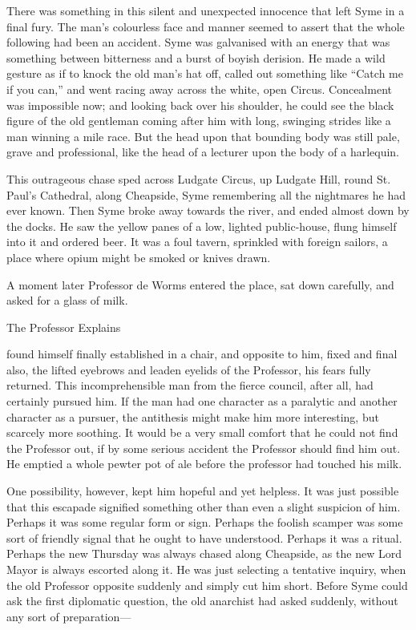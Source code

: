 There was something in this silent and unexpected innocence that left Syme in a final fury. The man’s colourless face and manner seemed to assert that the whole following had been an accident. Syme was galvanised with an energy that was something between bitterness and a burst of boyish derision. He made a wild gesture as if to knock the old man’s hat off, called out something like “Catch me if you can,” and went racing away across the white, open Circus. Concealment was impossible now; and looking back over his shoulder, he could see the black figure of the old gentleman coming after him with long, swinging strides like a man winning a mile race. But the head upon that bounding body was still pale, grave and professional, like the head of a lecturer upon the body of a harlequin.

This outrageous chase sped across Ludgate Circus, up Ludgate Hill, round St. Paul’s Cathedral, along Cheapside, Syme remembering all the nightmares he had ever known. Then Syme broke away towards the river, and ended almost down by the docks. He saw the yellow panes of a low, lighted public-house, flung himself into it and ordered beer. It was a foul tavern, sprinkled with foreign sailors, a place where opium might be smoked or knives drawn.

A moment later Professor de Worms entered the place, sat down carefully, and asked for a glass of milk.

\chap[professorexplains] The Professor Explains

 found himself finally established in a chair, and opposite to him, fixed and final also, the lifted eyebrows and leaden eyelids of the Professor, his fears fully returned. This incomprehensible man from the fierce council, after all, had certainly pursued him. If the man had one character as a paralytic and another character as a pursuer, the antithesis might make him more interesting, but scarcely more soothing. It would be a very small comfort that he could not find the Professor out, if by some serious accident the Professor should find him out. He emptied a whole pewter pot of ale before the professor had touched his milk.

One possibility, however, kept him hopeful and yet helpless. It was just possible that this escapade signified something other than even a slight suspicion of him. Perhaps it was some regular form or sign. Perhaps the foolish scamper was some sort of friendly signal that he ought to have understood. Perhaps it was a ritual. Perhaps the new Thursday was always chased along Cheapside, as the new Lord Mayor is always escorted along it. He was just selecting a tentative inquiry, when the old Professor opposite suddenly and simply cut him short. Before Syme could ask the first diplomatic question, the old anarchist had asked suddenly, without any sort of preparation⁠—


